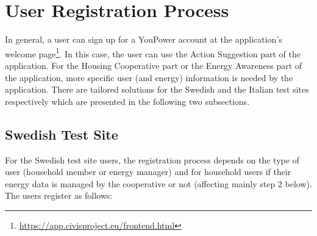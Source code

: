 \section{User Registration Process}
\label{sec:reg}

In general, a user can sign up for a YouPower account at the application's welcome page\footnote{\url{https://app.civisproject.eu/frontend.html}}. In this case, the user can use the Action Suggestion part of the application. For the Housing Cooperative part or the Energy Awareness part of the application, more specific user (and energy) information is needed by the application. There are tailored solutions for the Swedish and the Italian test sites respectively which are presented in the following two subsections. 

\subsection{Swedish Test Site}

For the Swedish test site users, the registration process depends on the type of user (household member or energy manager) and for household users if their energy data is managed by the cooperative or not (affecting mainly step 2 below). The users register as follows:


